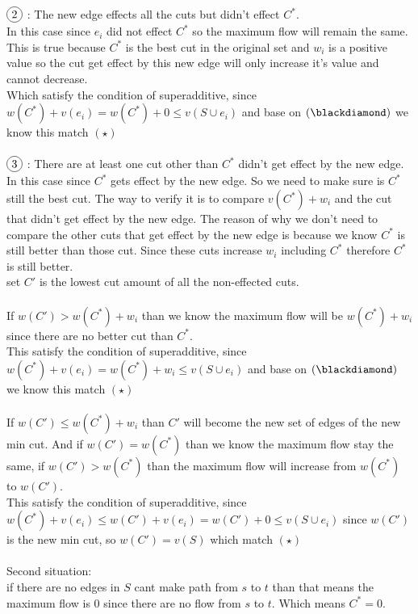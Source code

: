 \documentclass{article}
\newcommand*\circled[1]{\tikz[baseline=(char.base)]{
            \node[shape=circle,draw,inner sep=2pt] (char) {#1};}}
\begin{document}
$\circled{2}$ : The new edge effects all the cuts but didn't effect $C^*$.\\
In this case since $e_i$ did not effect $C^*$ so the maximum flow will remain the same. This is true because $C^*$ is the best cut in the original set and $w_i$ is a positive value so the cut get effect by this new edge will only increase it's value and cannot decrease.\\
Which satisfy the condition of superadditive, since $w(C^*) + v(e_i) = w(C^*) + 0 \leq v(S \cup e_i)$ and base on $(\blackdiamond)$ we know this match $(\star)$\\\\
$\circled{3}$ : There are at least one cut other than $C^*$ didn't get effect by the new edge.\\
In this case since $C^*$ gets effect by the new edge. So we need to make sure is $C^*$ still the best cut. The way to verify it is to compare $v(C^*) + w_i$ and the cut that didn't get effect by the new edge. The reason of why we don't need to compare the other cuts that get effect by the new edge is because we know $C^*$ is still better than those cut. Since these cuts increase $w_i$ including $C^*$ therefore $C^*$ is still better. \\
set $C'$ is the lowest cut amount of all the non-effected cuts.\\\\ If $w(C') > w(C^*) + w_i$ than we know the maximum flow will be $w(C^*) +w_i$ since there are no better cut than $C^*$.\\
This satisfy the condition of superadditive, since $w(C^*) + v(e_i) = w(C^*) + w_i \leq v(S \cup e_i)$ and base on $(\blackdiamond)$ we know this match $(\star)$\\\\
If $w(C') \leq w(C^*) + w_i$ than $C'$ will become the new set of edges of the new min cut. And if $w(C') = w(C^*)$ than we know the maximum flow stay the same, if  $w(C') > w(C^*)$ than the maximum flow will increase from $w(C^*)$ to $w(C')$.\\
This satisfy the condition of superadditive, since $w(C^*) + v(e_i) \leq w(C') + v(e_i) = w(C') + 0 \leq v(S \cup e_i)$
since $w(C')$ is the new min cut, so $w(C') = v(S)$ which match $(\star)$\\\\
Second situation:\\
if there are no edges in $S$ cant make path from $s$ to $t$ than that means the maximum flow is $0$ since there are no flow from $s$ to $t$. Which means $C^* = 0$.\\
\end{document}
